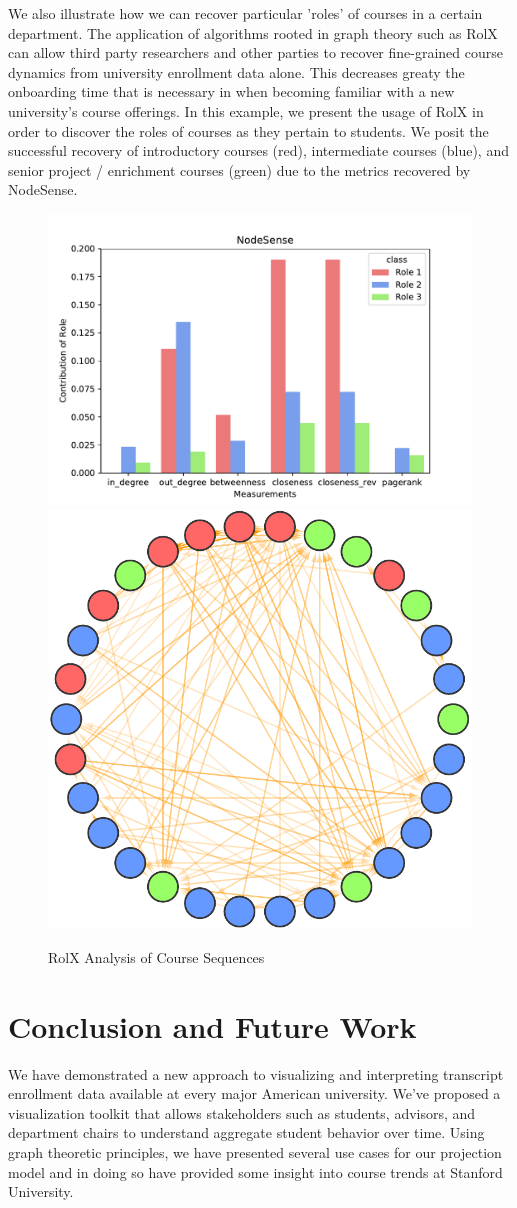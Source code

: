 \documentclass{sigchi}
\begin{document}
We also illustrate how we can recover particular 'roles' of courses in a certain department. The application of algorithms rooted in graph theory such as RolX \cite{Henderson2012} can allow third party researchers and other parties to recover fine-grained course dynamics from university enrollment data alone. This decreases greaty the onboarding time that is necessary in when becoming familiar with a new university's course offerings. In this example, we present the usage of RolX in order to discover the roles of courses as they pertain to students. We posit the successful recovery of introductory courses (red), intermediate courses (blue), and senior project / enrichment courses (green) due to the metrics recovered by NodeSense.


\begin{figure}
    \centering
    \includegraphics[width=0.75\columnwidth]{final-rolx-sense.pdf}
    \includegraphics[width=0.24\columnwidth]{final-rolx.pdf}
    \caption{RolX Analysis of Course Sequences}
    \label{fig:rolx}
\end{figure}


\section{Conclusion and Future Work}
\label{sec:conclusion}
We have demonstrated a new approach to visualizing and interpreting transcript enrollment data available at every major American university. We've proposed a visualization toolkit that allows stakeholders such as students, advisors, and department chairs to understand aggregate student behavior over time. Using graph theoretic principles, we have presented several use cases for our projection model and in doing so have provided some insight into course trends at Stanford University.
\end{document}
